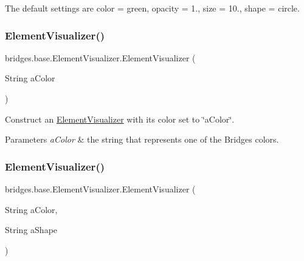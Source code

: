 The default settings are color = green, opacity = 1., size = 10., shape = circle. \hypertarget{classbridges_1_1base_1_1_element_visualizer_a5c0d9fe8051ebc816372b9836689fdfa}{}\label{classbridges_1_1base_1_1_element_visualizer_a5c0d9fe8051ebc816372b9836689fdfa} 
\subsubsection{\texorpdfstring{Element\+Visualizer()}{ElementVisualizer()}\hspace{0.1cm}{\footnotesize\ttfamily [2/6]}}
{\footnotesize\ttfamily bridges.\+base.\+Element\+Visualizer.\+Element\+Visualizer (\begin{DoxyParamCaption}\item[{String}]{a\+Color }\end{DoxyParamCaption})}

Construct an \hyperlink{classbridges_1_1base_1_1_element_visualizer}{Element\+Visualizer} with its color set to \char`\"{}a\+Color\char`\"{}.


\begin{DoxyParams}{Parameters}
{\em a\+Color} & the string that represents one of the Bridges colors. \\
\hline
\end{DoxyParams}
\hypertarget{classbridges_1_1base_1_1_element_visualizer_ab62b1b06907fbeddfcee2b4b297e1021}{}\label{classbridges_1_1base_1_1_element_visualizer_ab62b1b06907fbeddfcee2b4b297e1021} 
\subsubsection{\texorpdfstring{Element\+Visualizer()}{ElementVisualizer()}\hspace{0.1cm}{\footnotesize\ttfamily [3/6]}}
{\footnotesize\ttfamily bridges.\+base.\+Element\+Visualizer.\+Element\+Visualizer (\begin{DoxyParamCaption}\item[{String}]{a\+Color,  }\item[{String}]{a\+Shape }\end{DoxyParamCaption})}

